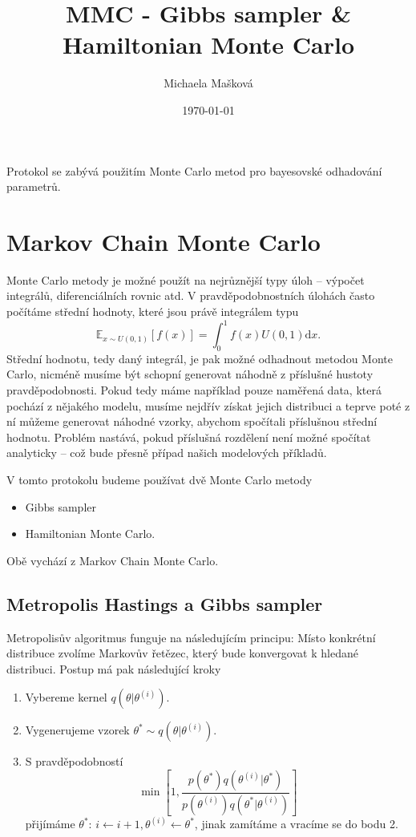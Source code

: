 \documentclass[11pt,oneside,american,czech]{article}
\title{MMC - Gibbs sampler \& Hamiltonian Monte Carlo}
\author{Michaela Mašková}
\date{\today}
\newcommand{\E}{\mathbb{E}}
\newcommand{\der}{\mathrm{d}}
\begin{document}
\def\listingsfont{\ttfamily}

\maketitle

Protokol se zabývá použitím Monte Carlo metod pro bayesovské odhadování parametrů.

\tableofcontents

\section{Markov Chain Monte Carlo}

Monte Carlo metody je možné použít na nejrůznější typy úloh -- výpočet integrálů, diferenciálních rovnic atd. V pravděpodobnostních úlohách často počítáme střední hodnoty, které jsou právě integrálem typu
\begin{equation*}
\E_{ x \sim U(0,1)} \left[ f(x) \right] = \int_0^1 f(x) U(0,1) \der x.
\end{equation*}
Střední hodnotu, tedy daný integrál, je pak možné odhadnout metodou Monte Carlo, nicméně musíme být schopní generovat náhodně z příslušné hustoty pravděpodobnosti. Pokud tedy máme například pouze naměřená data, která pochází z nějakého modelu, musíme nejdřív získat jejich distribuci a teprve poté z ní můžeme generovat náhodné vzorky, abychom spočítali příslušnou střední hodnotu. Problém nastává, pokud příslušná rozdělení není možné spočítat analyticky -- což bude přesně případ našich modelových příkladů.

V tomto protokolu budeme používat dvě Monte Carlo metody
\begin{itemize}
	\item Gibbs sampler
	\item Hamiltonian Monte Carlo.
\end{itemize}
Obě vychází z Markov Chain Monte Carlo.

\subsection{Metropolis Hastings a Gibbs sampler}
Metropolisův algoritmus funguje na následujícím principu: Místo konkrétní distribuce zvolíme Markovův řetězec, který bude konvergovat k hledané distribuci. Postup má pak následující kroky
\begin{enumerate}
	\item Vybereme kernel $q(\theta | \theta^{(i)})$.
	\item Vygenerujeme vzorek $\theta^* \sim q(\theta | \theta^{(i)})$.
	\item S pravděpodobností
	\begin{equation*}
	\min \left[ 1, \frac{p(\theta^{*})q(\theta^{(i)}|\theta^{*})}{p(\theta^{(i)}) q(\theta^*|\theta^{(i)})} \right]
	\end{equation*}
	přijímáme $\theta^{*}$: $i \leftarrow i + 1, \theta^{(i)} \leftarrow \theta^{*}$, jinak zamítáme a vracíme se do bodu 2.
\end{enumerate}
\end{document}
